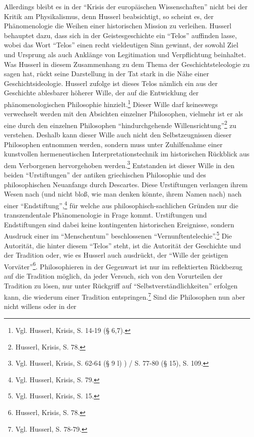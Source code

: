 Allerdings bleibt es in der "`Krisis der europäischen Wissenschaften"' nicht
bei der Kritik am Physikalismus, denn Husserl beabsichtigt, so scheint es, der
Phänomenologie die Weihen einer historischen Mission zu verleihen. Husserl
behauptet dazu, dass sich in der Geistesgeschichte ein "`Telos"' auf\/finden
lasse, wobei das Wort "`Telos"' einen recht vieldeutigen Sinn gewinnt, der
sowohl Ziel und Ursprung als auch Anklänge von Legitimation und Verpflichtung
beinhaltet. Was Husserl in diesem Zusammenhang zu dem Thema der
Geschichtsteleologie zu sagen hat, rückt seine Darstellung in der Tat stark in
die Nähe einer Geschichtsideologie. Husserl zufolge ist dieses Telos nämlich
ein aus der Geschichte ablesbarer höherer Wille, der auf die Entwicklung der
phänomenologischen Philosophie hinzielt.\footnote{Vgl. Husserl, Krisis, S.
  14-19 (§ 6,7).} Dieser Wille darf keineswegs verwechselt werden mit den
Absichten einzelner Philosophen, vielmehr ist er als eine durch den einzelnen
Philosophen "`hindurchgehende Willensrichtung"'\footnote{Husserl, Krisis, S.
  78.} zu verstehen.  Deshalb kann dieser Wille auch nicht den
Selbstzeugnissen dieser Philosophen entnommen werden, sondern muss unter
Zuhilfenahme einer kunstvollen hermeneutischen Interpretationstechnik im
historischen Rückblick aus dem Verborgenen hervorgehoben werden.\footnote{Vgl.
  Husserl, Krisis, S. 62-64 (§ 9 l) ) / S. 77-80 (§ 15), S. 109.}  Entstanden
ist dieser Wille in den beiden "`Urstiftungen"' der antiken griechischen
Philosophie und des philosophischen Neuanfangs durch Descartes.  Diese
Urstiftungen verlangen ihrem Wesen nach (und nicht bloß, wie man denken
könnte, ihrem Namen nach) nach einer "`Endstiftung"',\footnote{Vgl.  Husserl,
  Krisis, S. 79.} für welche aus philosophisch-sachlichen Gründen nur die
transzendentale Phänomenologie in Frage kommt. Urstiftungen und Endstiftungen
sind dabei keine kontingenten historischen Ereignisse, sondern Ausdruck einer
im "`Menschentum"' beschlossenen "`Vernunftentelechie"'.\footnote{Vgl.
  Husserl, Krisis, S. 15.} Die Autorität, die hinter diesem "`Telos"' steht,
ist die Autorität der Geschichte und der Tradition oder, wie es Husserl auch
ausdrückt, der "`Wille der geistigen Vorväter"'\footnote{Husserl, Krisis, S.
  78.}. Philosophieren in der Gegenwart ist nur im reflektierten Rückbezug auf
die Tradition möglich, da jeder Versuch, sich von den Vorurteilen der
Tradition zu lösen, nur unter Rückgriff auf "`Selbstverständlichkeiten"'
erfolgen kann, die wiederum einer Tradition entspringen.\footnote{Vgl.
  Husserl, S. 78-79.} Sind die Philosophen nun aber nicht willens oder in der
